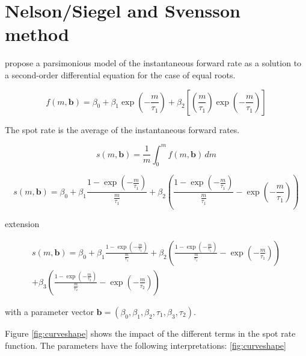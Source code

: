 \section{Nelson/Siegel and Svensson method}
\label{sec:nels-svenss-meth}

\cite{Nelson1987} propose a parsimonious  model of  the instantaneous forward rate as a solution to a second-order differential equation for the case of equal roots.

\begin{equation}
  \label{eq:laguerre}
  f(m,\bm{b}) = \beta_0+\beta_1\exp\left(-\frac{m}{\tau_1}\right)+\beta_2\left[\left(\frac{m}{\tau_1}\right)\exp\left(-\frac{m}{\tau_1}\right)\right]
\end{equation}


The spot rate is the average of the instantaneous forward rates. 

\begin{equation}
  \label{eq:intspotrate}
  s(m,\bm{b})=\frac{1}{m}\int_0^mf(m,\bm{b})\,dm
\end{equation}


\begin{equation}
  \label{eq:nelson-spot}
   s(m,\bm{b}) = \beta_0 + \beta_1\frac{1-\exp(-\frac{m}{\tau_1})}{\frac{m}{\tau_1}} + \beta_2\left(\frac{1-\exp(-\frac{m}{\tau_1})}{\frac{m}{\tau_1}} - \exp(-\frac{m}{\tau_1})\right)
\end{equation}


 
\cite{Svensson1994} extension


\begin{multline}\label{eq:svensson-spot}
    s(m,\bm{b}) = \beta_0 + \beta_1\frac{1-\exp(-\frac{m}{\tau_1})}{\frac{m}{\tau_1}} + \beta_2\left(\frac{1-\exp(-\frac{m}{\tau_1})}{\frac{m}{\tau_1}} - \exp(-\frac{m}{\tau_1})\right) \\+ \beta_3\left(\frac{1-\exp(-\frac{m}{\tau_2})}{\frac{m}{\tau_2}} - \exp(-\frac{m}{\tau_2})\right)
\end{multline}



with a parameter vector ${\bm{b}} = \left(\beta_0,\beta_1,\beta_2,\tau_1,\beta_3,\tau_2\right)$.

Figure \ref{fig:curveshape} shows the impact of the different terms in the spot rate function. The parameters have the following interpretations: \ref{fig:curveshape}

